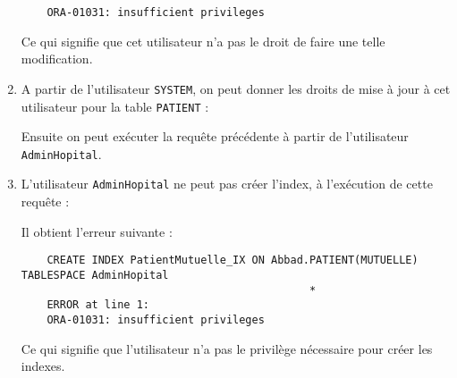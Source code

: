 \documentclass[12pt,a4paper]{article}
\begin{document}
\begin{enumerate}
\begin{verbatim}
	ORA-01031: insufficient privileges
	\end{verbatim}
	Ce qui signifie que cet utilisateur n'a pas le droit de faire une telle modification.
	\item A partir de l'utilisateur \texttt{SYSTEM}, on peut donner les droits de mise à jour à cet utilisateur
	pour la table \texttt{PATIENT} :
	
	Ensuite on peut exécuter la requête précédente à partir de l'utilisateur \texttt{AdminHopital}.
	
	\item L'utilisateur \texttt{AdminHopital} ne peut pas créer l'index, à l'exécution de cette requête :
	
	Il obtient l'erreur suivante :
	\begin{verbatim}
	CREATE INDEX PatientMutuelle_IX ON Abbad.PATIENT(MUTUELLE) TABLESPACE AdminHopital
	                                         *
	ERROR at line 1:
	ORA-01031: insufficient privileges
	\end{verbatim}
	Ce qui signifie que l'utilisateur n'a pas le privilège nécessaire pour créer les indexes.
\end{enumerate}
\end{document}
